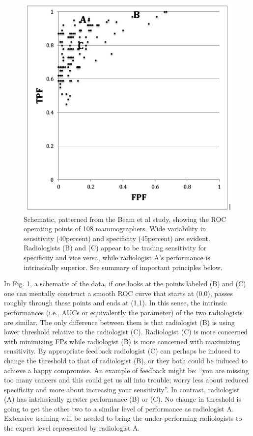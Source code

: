 \documentclass[
]{book}
\begin{document}
\begin{figure}
\includegraphics[width=0.8\linewidth]{images/BeamStudy} \caption{Schematic, patterned from the Beam et al study, showing the ROC operating points of 108 mammographers. Wide variability in sensitivity (40percent) and specificity (45percent) are evident. Radiologists (B) and (C) appear to be trading sensitivity for specificity and vice versa, while radiologist A's performance is intrinsically superior. See summary of important principles below.}\label{fig:beam-study-fig}
\end{figure}

In Fig. \ref{fig:beam-study-fig}, a schematic of the data, if one looks at the points labeled (B) and (C) one can mentally construct a smooth ROC curve that starts at (0,0), passes roughly through these points and ends at (1,1). In this sense, the intrinsic performances (i.e., AUCs or equivalently the parameter) of the two radiologists are similar. The only difference between them is that radiologist (B) is using lower threshold relative to the radiologist (C). Radiologist (C) is more concerned with minimizing FPs while radiologist (B) is more concerned with maximizing sensitivity. By appropriate feedback radiologist (C) can perhaps be induced to change the threshold to that of radiologist (B), or they both could be induced to achieve a happy compromise. An example of feedback might be: ``you are missing too many cancers and this could get us all into trouble; worry less about reduced specificity and more about increasing your sensitivity''. In contrast, radiologist (A) has intrinsically greater performance (B) or (C). No change in threshold is going to get the other two to a similar level of performance as radiologist A. Extensive training will be needed to bring the under-performing radiologists to the expert level represented by radiologist A.
\end{document}
